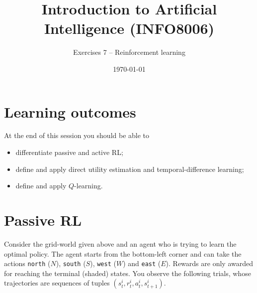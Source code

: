 \documentclass[11pt, a4paper]{article}
\title{Introduction to Artificial Intelligence (INFO8006)}
\subtitle{Exercises 7 -- Reinforcement learning}
\date{\today}
\begin{document}
\maketitle

\section*{Learning outcomes}

At the end of this session you should be able to
\begin{itemize}[noitemsep]
    \item differentiate passive and active RL;
    \item define and apply direct utility estimation and temporal-difference learning;
    \item define and apply $Q$-learning.
\end{itemize}

\section{Passive RL}

\begin{center}
    \vspace{+1ex}
    \vspace{-1ex}
\end{center}

Consider the grid-world given above and an agent who is trying to learn the optimal policy. The agent starts from the bottom-left corner and can take the actions \texttt{north} ($N$), \texttt{south} ($S$), \texttt{west} ($W$) and \texttt{east} ($E$). Rewards are only awarded for reaching the terminal (shaded) states. You observe the following trials, whose trajectories are sequences of tuples $(s^i_t, r^i_t, a^i_t, s^i_{t+1})$.
\end{document}

